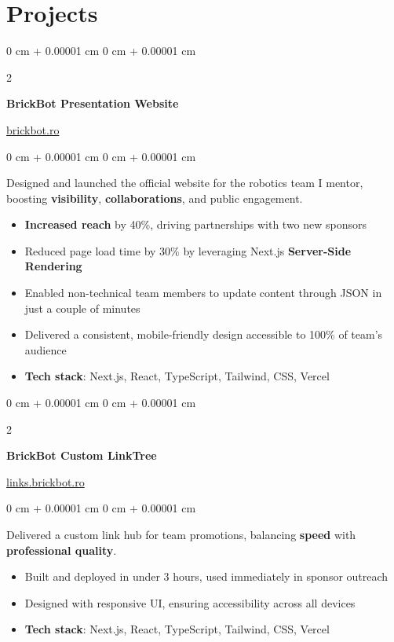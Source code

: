 \documentclass[10pt, letterpaper]{article}
\newenvironment{highlights}{
    \begin{itemize}[
        topsep=0.10 cm,
        parsep=0.10 cm,
        partopsep=0pt,
        itemsep=0pt,
        leftmargin=0 cm + 10pt
    ]
}{
    \end{itemize}
} %
\newenvironment{onecolentry}{
    \begin{adjustwidth}{
        0 cm + 0.00001 cm
    }{
        0 cm + 0.00001 cm
    }
}{
    \end{adjustwidth}
} %
\newenvironment{twocolentry}[2][]{
    \onecolentry
    \def\secondColumn{#2}
    \setcolumnwidth{\fill, 4.5 cm}
    \begin{paracol}{2}
}{
    \switchcolumn \raggedleft \secondColumn
    \end{paracol}
    \endonecolentry
} %
\begin{document}
    \section{Projects}

\begin{twocolentry}{
    \href{https://brickbot.ro}{brickbot.ro}
}
    \textbf{BrickBot Presentation Website}
\end{twocolentry}

\vspace{0.10 cm}
\begin{onecolentry}
    Designed and launched the official website for the robotics team I mentor, boosting \textbf{visibility}, \textbf{collaborations}, and public engagement.
    \begin{highlights}
        \item \textbf{Increased reach} by 40\%, driving partnerships with two new sponsors
        \item Reduced page load time by 30\% by leveraging Next.js \textbf{Server-Side Rendering}
        \item Enabled non-technical team members to update content through JSON in just a couple of minutes
        \item Delivered a consistent, mobile-friendly design accessible to 100\% of team’s audience
        \item \textbf{Tech stack}: Next.js, React, TypeScript, Tailwind, CSS, Vercel 
    \end{highlights}
\end{onecolentry}

\vspace{0.2 cm}

\begin{twocolentry}{
    \href{https://links.brickbot.ro}{links.brickbot.ro}
}
    \textbf{BrickBot Custom LinkTree}
\end{twocolentry}
\vspace{0.10 cm}
\begin{onecolentry}
    Delivered a custom link hub for team promotions, balancing \textbf{speed} with \textbf{professional quality}. 
    \begin{highlights}
        \item Built and deployed in under 3 hours, used immediately in sponsor outreach
        \item Designed with responsive UI, ensuring accessibility across all devices
        \item \textbf{Tech stack}: Next.js, React, TypeScript, Tailwind, CSS, Vercel 
    \end{highlights}
\end{onecolentry}
\end{document}
